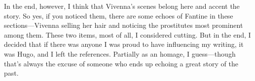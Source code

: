 In the end, however, I think that Vivenna’s scenes belong here and accent the story. So yes, if you noticed them, there are some echoes of Fantine in these sections—Vivenna selling her hair and noticing the prostitutes most prominent among them. These two items, most of all, I considered cutting. But in the end, I decided that if there was anyone I was proud to have influencing my writing, it was Hugo, and I left the references. Partially as an homage, I guess—though that’s always the excuse of someone who ends up echoing a great story of the past.



